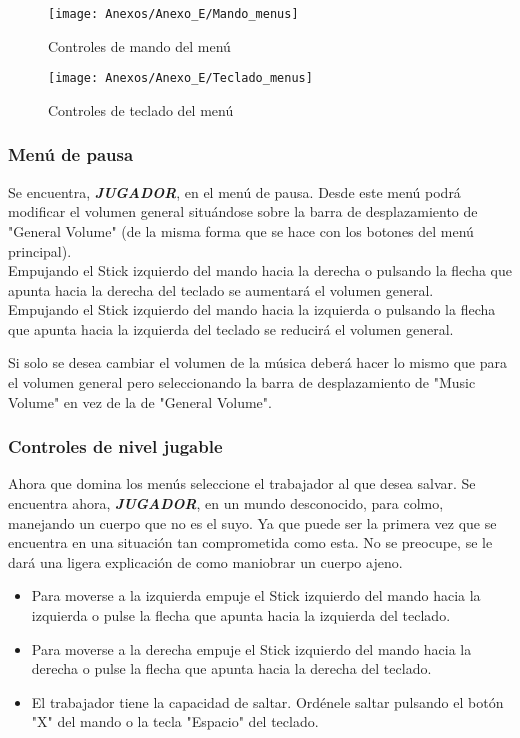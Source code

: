 \begin{figure}[h]
\centering
\texttt{[image: Anexos/Anexo\_E/Mando\_menus]}
\caption{Controles de mando del menú}
\end{figure}

\begin{figure}[h]
\centering
\texttt{[image: Anexos/Anexo\_E/Teclado\_menus]}
\caption{Controles de teclado del menú}
\end{figure}

\subsubsection{Menú de pausa}
Se encuentra, \textit{\textbf{JUGADOR}}, en el menú de pausa. Desde este menú podrá modificar el volumen general situándose sobre la barra de desplazamiento de "General Volume" (de la misma forma que se hace con los botones del menú principal).\\
Empujando el Stick izquierdo del mando hacia la derecha o pulsando la flecha que apunta hacia la derecha del teclado se aumentará el volumen general.\\
Empujando el Stick izquierdo del mando hacia la izquierda o pulsando la flecha que apunta hacia la izquierda del teclado se reducirá el volumen general.

Si solo se desea cambiar el volumen de la música deberá hacer lo mismo que para el volumen general pero seleccionando la barra de desplazamiento de "Music Volume" en vez de la de "General Volume".

\subsubsection{Controles de nivel jugable}
Ahora que domina los menús seleccione el \textcolor{azulWorker}{trabajador} al que desea salvar. Se encuentra ahora, \textit{\textbf{JUGADOR}}, en un \textcolor{endeavour}{mundo desconocido}, para colmo, manejando un cuerpo que no es el suyo. Ya que puede ser la primera vez que se encuentra en una situación tan comprometida como esta. No se preocupe, se le dará una ligera explicación de como maniobrar un cuerpo ajeno.
\begin{itemize}
\item
Para moverse a la izquierda empuje el Stick izquierdo del mando hacia la izquierda o pulse la flecha que apunta hacia la izquierda del teclado.
\item
Para moverse a la derecha empuje el Stick izquierdo del mando hacia la derecha o pulse la flecha que apunta hacia la derecha del teclado.
\item
El \textcolor{azulWorker}{trabajador} tiene la capacidad de saltar. Ordénele saltar pulsando el botón "X" del mando o la tecla "Espacio" del teclado.
\end{itemize}

